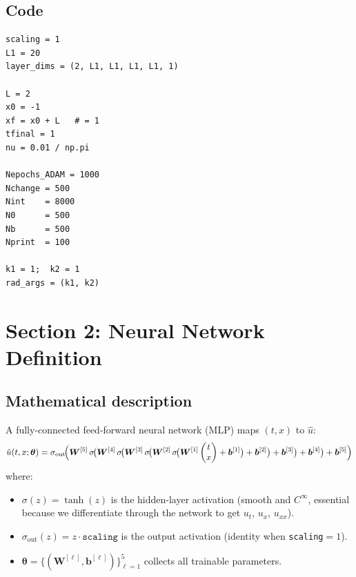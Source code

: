 \documentclass[11pt,a4paper]{article}
\begin{document}
\subsection*{Code}

\begin{lstlisting}
scaling = 1
L1 = 20
layer_dims = (2, L1, L1, L1, L1, 1)

L = 2
x0 = -1
xf = x0 + L   # = 1
tfinal = 1
nu = 0.01 / np.pi

Nepochs_ADAM = 1000
Nchange = 500
Nint    = 8000
N0      = 500
Nb      = 500
Nprint  = 100

k1 = 1;  k2 = 1
rad_args = (k1, k2)
\end{lstlisting}


\section{Section 2: Neural Network Definition}
\label{sec:network}

\subsection*{Mathematical description}

A fully-connected feed-forward neural network (MLP) maps $(t,x)$ to $\hat{u}$:
\begin{equation}
  \hat{u}(t,x;\bm{\theta}) = \sigma_{\text{out}}\!\Bigl(
    \bm{W}^{[5]}\,\sigma\!\bigl(
      \bm{W}^{[4]}\,\sigma\!\bigl(
        \bm{W}^{[3]}\,\sigma\!\bigl(
          \bm{W}^{[2]}\,\sigma\!\bigl(
            \bm{W}^{[1]} \begin{pmatrix} t \\ x \end{pmatrix}
            + \bm{b}^{[1]}
          \bigr) + \bm{b}^{[2]}
        \bigr) + \bm{b}^{[3]}
      \bigr) + \bm{b}^{[4]}
    \bigr) + \bm{b}^{[5]}
  \Bigr)
\label{eq:mlp}
\end{equation}
where:
\begin{itemize}[nosep]
  \item $\sigma(z) = \tanh(z)$ is the hidden-layer activation (smooth and $C^\infty$,
        essential because we differentiate through the network to get $u_t$, $u_x$, $u_{xx}$).
  \item $\sigma_{\text{out}}(z) = z \cdot \texttt{scaling}$ is the output activation
        (identity when \texttt{scaling}$=1$).
  \item $\bm{\theta} = \{(\bm{W}^{[\ell]}, \bm{b}^{[\ell]})\}_{\ell=1}^{5}$
        collects all trainable parameters.
\end{itemize}
\end{document}
